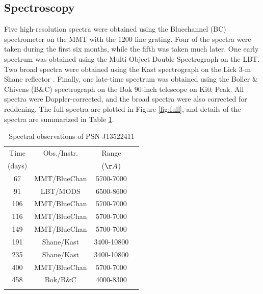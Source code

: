 \documentclass[iop]{emulateapj}
\begin{document}
\subsection{Spectroscopy} \label{obs:spec}
Five high-resolution spectra were obtained using the Bluechannel (BC) spectrometer on the MMT with the 1200 line grating. Four of the spectra were taken during the first six months, while the fifth was taken much later. One early spectrum was obtained using the Multi Object Double Spectrograph \citep[MODS]{Bya00} on the LBT. Two broad spectra were obtained using the Kast spectrograph on the Lick 3-m Shane reflector \citep{Mil93}. Finally, one late-time spectrum was obtained using the Boller \& Chivens (B\&C) spectrograph on the Bok 90-inch telescope on Kitt Peak. All spectra were Doppler-corrected, and the broad spectra were also corrected for reddening. The full spectra are plotted in Figure \ref{fig:full}, and details of the spectra are summarized in Table \ref{tab:spectra}.

\begin{table}\begin{center}\begin{minipage}{3.25in}
      \caption{Spectral observations of PSN J13522411}
\centering
\scriptsize
\tighten
\begin{tabular}{@{}cccc}\hline\hline
Time &Obs./Instr. &Range \\
(days) & &($\AA$) \\
\hline
67  &MMT/BlueChan &5700-7000 \\
91  &LBT/MODS     &6500-8600 \\
106 &MMT/BlueChan &5700-7000 \\
116 &MMT/BlueChan &5700-7000 \\
149 &MMT/BlueChan &5700-7000 \\
191 &Shane/Kast   &3400-10800 \\
235 &Shane/Kast   &3400-10800 \\
400 &MMT/BlueChan &5700-7000 \\
458 &Bok/B\&C     &4000-8300 \\
\hline \\
\end{tabular}
\label{tab:spectra}
\end{minipage}\end{center}
\end{table}
\end{document}
